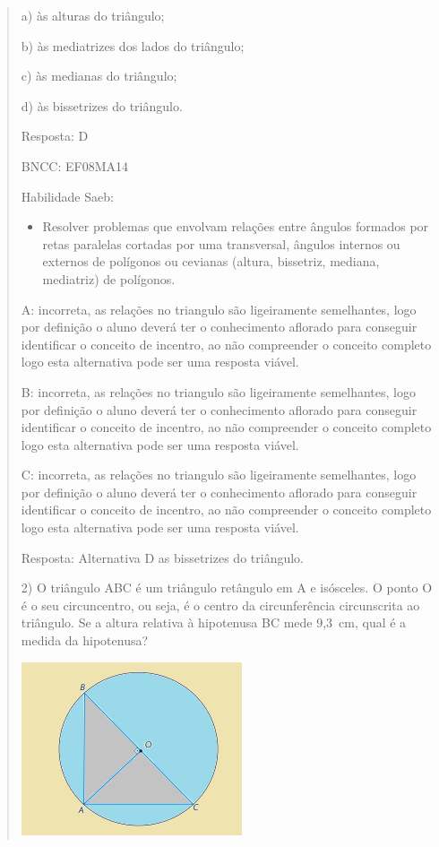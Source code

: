 \begin{quote}
\begin{escolha}
a) às alturas do triângulo;

b) às mediatrizes dos lados do triângulo;

c) às medianas do triângulo;

d) às bissetrizes do triângulo.

Resposta: D

BNCC: EF08MA14

Habilidade Saeb:

\begin{itemize}
\tightlist
\item
  Resolver problemas que envolvam relações entre ângulos formados por
  retas paralelas cortadas por uma transversal, ângulos internos ou
  externos de polígonos ou cevianas (altura, bissetriz, mediana,
  mediatriz) de polígonos.
\end{itemize}

A: incorreta, as relações no triangulo são ligeiramente semelhantes,
logo por definição o aluno deverá ter o conhecimento aflorado para
conseguir identificar o conceito de incentro, ao não compreender o
conceito completo logo esta alternativa pode ser uma resposta viável.

B: incorreta, as relações no triangulo são ligeiramente semelhantes,
logo por definição o aluno deverá ter o conhecimento aflorado para
conseguir identificar o conceito de incentro, ao não compreender o
conceito completo logo esta alternativa pode ser uma resposta viável.

C: incorreta, as relações no triangulo são ligeiramente semelhantes,
logo por definição o aluno deverá ter o conhecimento aflorado para
conseguir identificar o conceito de incentro, ao não compreender o
conceito completo logo esta alternativa pode ser uma resposta viável.

Resposta: Alternativa D as bissetrizes do triângulo.

2) O triângulo ABC é um triângulo retângulo em A e isósceles. O ponto O
é o seu circuncentro, ou seja, é o centro da circunferência circunscrita
ao triângulo. Se a altura relativa à hipotenusa BC mede 9,3~cm, qual é a
medida da hipotenusa?

\includegraphics[width=2.5625in,height=2.02083in]{./imgSAEB_8_MAT/media/image35.png}


\end{escolha}
\end{quote}
